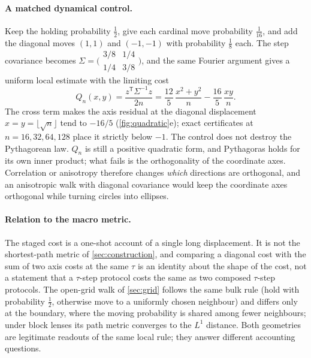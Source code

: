 \paragraph{A matched dynamical control.}
Keep the holding probability $\tfrac12$, give each cardinal move probability $\tfrac1{16}$, and add the diagonal moves $(1,1)$ and $(-1,-1)$ with probability $\tfrac18$ each.
The step covariance becomes $\Sigma=\bigl(\begin{smallmatrix}3/8&1/4\\1/4&3/8\end{smallmatrix}\bigr)$, and the same Fourier argument gives a uniform local estimate with the limiting cost
\begin{equation}
Q_n(x,y)=\frac{z^{\mathsf T}\Sigma^{-1}z}{2n}=\frac{12}{5}\,\frac{x^2+y^2}{n}-\frac{16}{5}\,\frac{xy}{n}.
\end{equation}
The cross term makes the axis residual at the diagonal displacement $x=y=\lfloor\sqrt n\rfloor$ tend to $-16/5$ (\cref{fig:quadratic}e); exact certificates at $n=16,32,64,128$ place it strictly below $-1$.
The control does not destroy the Pythagorean law.
$Q_n$ is still a positive quadratic form, and Pythagoras holds for its own inner product; what fails is the orthogonality of the coordinate axes.
Correlation or anisotropy therefore changes \emph{which} directions are orthogonal, and an anisotropic walk with diagonal covariance would keep the coordinate axes orthogonal while turning circles into ellipses.


\paragraph{Relation to the macro metric.}
The staged cost is a one-shot account of a single long displacement.
It is not the shortest-path metric of \cref{sec:construction}, and comparing a diagonal cost with the sum of two axis costs at the same $\tau$ is an identity about the shape of the cost, not a statement that a $\tau$-step protocol costs the same as two composed $\tau$-step protocols.
The open-grid walk of \cref{sec:grid} follows the same bulk rule (hold with probability $\tfrac12$, otherwise move to a uniformly chosen neighbour) and differs only at the boundary, where the moving probability is shared among fewer neighbours; under block lenses its path metric converges to the $L^1$ distance.
Both geometries are legitimate readouts of the same local rule; they answer different accounting questions.
